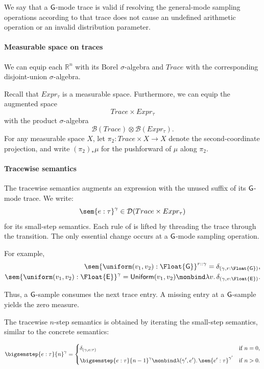 We say that a $\mathsf{G}$-mode trace is valid if resolving the general-mode sampling operations according to that trace does not cause an undefined arithmetic operation or an invalid distribution parameter.

\paragraph{Measurable space on traces}
We can equip each $\mathbb R^n$ with its Borel $\sigma$-algebra and $Trace$ with the corresponding disjoint-union $\sigma$-algebra. 

Recall that $Expr_\tau$ is a measurable space. Furthermore, we can equip the augmented space
\[
  Trace\times Expr_\tau
\]
with the product \(\sigma\)-algebra
\[
  \mathcal B(Trace)\otimes\mathcal B(Expr_\tau).
\]
For any measurable space $X$, let $\pi_2:Trace\times X\to X$ denote
the second-coordinate projection, and write $(\pi_2)_*\mu$ for the
pushforward of $\mu$ along $\pi_2$.

\paragraph{Tracewise semantics}
The tracewise semantics augments an expression with the unused suffix of its $\mathsf{G}$-mode trace. We write:
\[
  \sem{e : \tau}^\gamma
  \in
  \mathcal D(Trace\times Expr_\tau)
\]
for its small-step semantics. Each rule of
 is lifted by threading the trace through the
transition. The only essential change occurs at a $\mathsf{G}$-mode sampling operation. 

For example,
\begin{align*}
\sem{\uniform(v_1,v_2):\Float{\G}}^{r::\gamma}
=
\delta_{(\gamma,r:\Float{\G})},
\\
\sem{\uniform(v_1,v_2):\Float{\E}}^\gamma
=
\mathsf{Uniform}(v_1,v_2)
\monbind\lambda v.\,
\delta_{(\gamma,v:\Float{\E})}.
\end{align*}

Thus, a \(\mathsf{G}\)-sample consumes the next trace entry. A missing entry at a \(\mathsf{G}\)-sample yields the zero measure.

The tracewise $n$-step semantics is obtained by iterating the small-step semantics, similar to the concrete semantics:

\[
  \bigsemstep{e:\tau}{n}^{\gamma}
  =
  \begin{cases}
    \delta_{(\gamma,e:\tau)}
      & \text{if } n=0, \\[2mm]
    \displaystyle
    \bigsemstep{e:\tau}{n-1}^{\gamma}
    \monbind
    \lambda(\gamma',e').\,
    \sem{e':\tau}^{\gamma'}
      & \text{if } n>0.
  \end{cases}
\]

